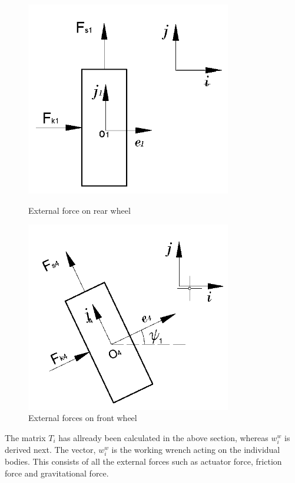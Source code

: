 \begin{figure}
	\begin{minipage}[t]{0.5\textwidth}
		\centering
		\includegraphics[width=0.8\textwidth]{Chapter4/fig/ForceWheel1}
		\caption{External force on rear wheel}\label{fig:ForceRearWheel}
	\end{minipage}
	\hfill
	\begin{minipage}[t]{0.5\textwidth}
		\centering
		\includegraphics[width=0.8\textwidth]{Chapter4/fig/ForceWheel2}
		\caption{External forces on front wheel }\label{fig:ForceFrontWheel}
	\end{minipage}
\end{figure} 
The matrix $T_i$ has allready been calculated in the above section, whereas $w_i^w$ is derived next. The vector, $w_i^w$ is the working wrench acting on the individual bodies. This consists of all the external forces such as actuator force, friction force and gravitational force.
